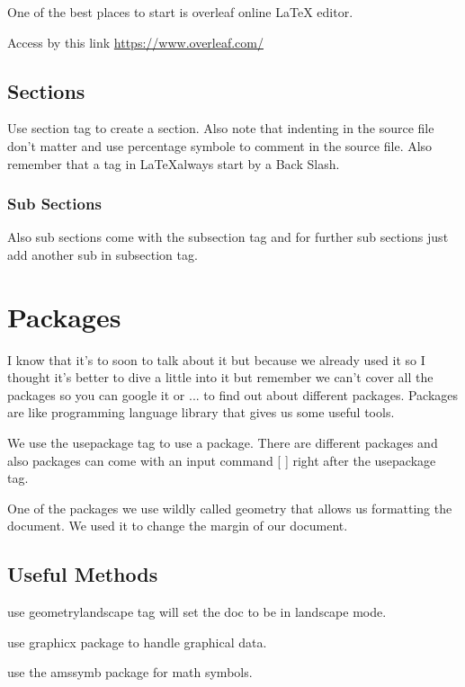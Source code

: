 \documentclass{article} %
\begin{document}
    
    One of the best places to start is overleaf online LaTeX editor.  
     
    \noindent Access by this link \url{https://www.overleaf.com/}
    
    \subsection{Sections}
        Use section tag to create a section. Also note that indenting in the source file don't matter and use percentage symbole to comment in the source file. Also remember that a tag in \LaTeX \space always start by a Back Slash.
        \subsubsection{Sub Sections}
            Also sub sections come with the subsection tag and for further sub sections just add another sub in subsection tag. 

\section{Packages}
    I know that it's to soon to talk about it but because we already used it so I thought it's better to dive a little into it but remember we can't cover all the packages so you can google it or ... to find out about different packages. Packages are like programming language library that gives us some useful tools.
    
    \noindent We use the usepackage tag to use a package. There are different packages and also packages can come with an input command [ ] right after the usepackage tag.
    
    \noindent One of the packages we use wildly called geometry that allows us formatting the document. We used it to change the margin of our document.

    \subsection{Useful Methods}
        use geometry{landscape} tag will set the doc to be in landscape mode.
        
        \noindent use graphicx package to handle graphical data.
    
        \noindent use the amssymb package for math symbols.
        
\end{document}
